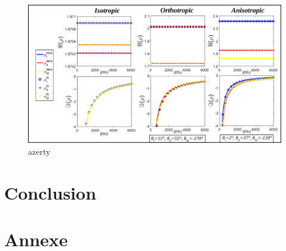 \documentclass{article}
\begin{document}
    \begin{figure}[ht]
        \centering
        \includegraphics[scale=0.3]{Density_dir.png}
        \caption{azerty}
        \label{Grph_rho_dir}
    \end{figure}
\section{Conclusion}


\section{Annexe}
\end{document}
